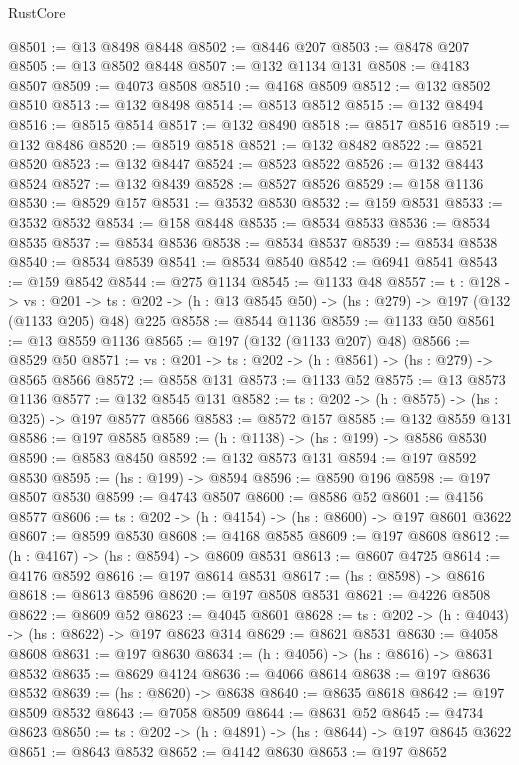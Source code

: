 \begin{lexlean}{RustCore}
\begin{coremodule}
@8501 := @13 @8498 @8448
@8502 := @8446 @207
@8503 := @8478 @207
@8505 := @13 @8502 @8448
@8507 := @132 @1134 @131
@8508 := @4183 @8507
@8509 := @4073 @8508
@8510 := @4168 @8509
@8512 := @132 @8502 @8510
@8513 := @132 @8498
@8514 := @8513 @8512
@8515 := @132 @8494
@8516 := @8515 @8514
@8517 := @132 @8490
@8518 := @8517 @8516
@8519 := @132 @8486
@8520 := @8519 @8518
@8521 := @132 @8482
@8522 := @8521 @8520
@8523 := @132 @8447
@8524 := @8523 @8522
@8526 := @132 @8443 @8524
@8527 := @132 @8439
@8528 := @8527 @8526
@8529 := @158 @1136
@8530 := @8529 @157
@8531 := @3532 @8530
@8532 := @159 @8531
@8533 := @3532 @8532
@8534 := @158 @8448
@8535 := @8534 @8533
@8536 := @8534 @8535
@8537 := @8534 @8536
@8538 := @8534 @8537
@8539 := @8534 @8538
@8540 := @8534 @8539
@8541 := @8534 @8540
@8542 := @6941 @8541
@8543 := @159 @8542
@8544 := @275 @1134
@8545 := @1133 @48
@8557 := {t : @128} ->
  {vs : @201} ->
  {ts : @202} -> (h : @13 @8545 @50) -> (hs : @279) -> @197 (@132 (@1133 @205) @48) @225
@8558 := @8544 @1136
@8559 := @1133 @50
@8561 := @13 @8559 @1136
@8565 := @197 (@132 (@1133 @207) @48)
@8566 := @8529 @50
@8571 := {vs : @201} -> {ts : @202} -> (h : @8561) -> (hs : @279) -> @8565 @8566
@8572 := @8558 @131
@8573 := @1133 @52
@8575 := @13 @8573 @1136
@8577 := @132 @8545 @131
@8582 := {ts : @202} -> (h : @8575) -> (hs : @325) -> @197 @8577 @8566
@8583 := @8572 @157
@8585 := @132 @8559 @131
@8586 := @197 @8585
@8589 := (h : @1138) -> (hs : @199) -> @8586 @8530
@8590 := @8583 @8450
@8592 := @132 @8573 @131
@8594 := @197 @8592 @8530
@8595 := (hs : @199) -> @8594
@8596 := @8590 @196
@8598 := @197 @8507 @8530
@8599 := @4743 @8507
@8600 := @8586 @52
@8601 := @4156 @8577
@8606 := {ts : @202} -> (h : @4154) -> (hs : @8600) -> @197 @8601 @3622
@8607 := @8599 @8530
@8608 := @4168 @8585
@8609 := @197 @8608
@8612 := (h : @4167) -> (hs : @8594) -> @8609 @8531
@8613 := @8607 @4725
@8614 := @4176 @8592
@8616 := @197 @8614 @8531
@8617 := (hs : @8598) -> @8616
@8618 := @8613 @8596
@8620 := @197 @8508 @8531
@8621 := @4226 @8508
@8622 := @8609 @52
@8623 := @4045 @8601
@8628 := {ts : @202} -> (h : @4043) -> (hs : @8622) -> @197 @8623 @314
@8629 := @8621 @8531
@8630 := @4058 @8608
@8631 := @197 @8630
@8634 := (h : @4056) -> (hs : @8616) -> @8631 @8532
@8635 := @8629 @4124
@8636 := @4066 @8614
@8638 := @197 @8636 @8532
@8639 := (hs : @8620) -> @8638
@8640 := @8635 @8618
@8642 := @197 @8509 @8532
@8643 := @7058 @8509
@8644 := @8631 @52
@8645 := @4734 @8623
@8650 := {ts : @202} -> (h : @4891) -> (hs : @8644) -> @197 @8645 @3622
@8651 := @8643 @8532
@8652 := @4142 @8630
@8653 := @197 @8652

\end{coremodule}
\end{lexlean}
